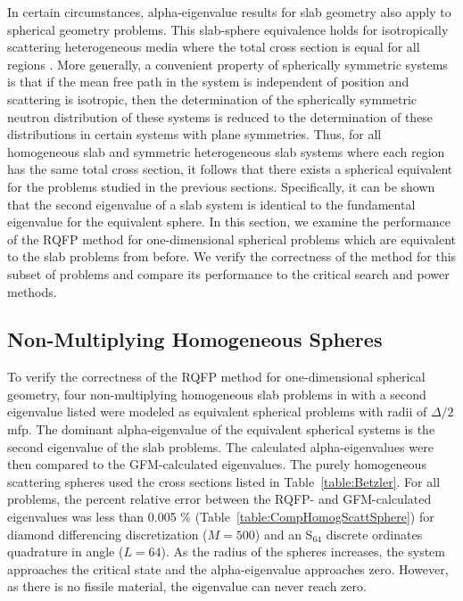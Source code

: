 In certain circumstances, alpha-eigenvalue results for slab geometry also apply to spherical geometry problems. This slab-sphere equivalence holds for isotropically scattering heterogeneous media where the total cross section is equal for all regions \cite{davison1957neutron}. More generally, a convenient property of spherically symmetric systems is that if the mean free path in the system is independent of position and scattering is isotropic, then the determination of the spherically symmetric neutron distribution of these systems is reduced to the determination of these distributions in certain systems with plane symmetries. Thus, for all homogeneous slab and symmetric heterogeneous slab systems where each region has the same total cross section, it follows that there exists a spherical equivalent for the problems studied in the previous sections. Specifically, it can be shown that the second eigenvalue of a slab system is identical to the fundamental eigenvalue for the equivalent sphere. In this section, we examine the performance of the RQFP method for one-dimensional spherical problems which are equivalent to the slab problems from before. We verify the correctness of the method for this subset of problems and compare its performance to the critical search and power methods.

\subsection{Non-Multiplying Homogeneous Spheres}

To verify the correctness of the RQFP method for one-dimensional spherical geometry, four non-multiplying homogeneous slab problems in \cite{kornreich_greens_1997} with a second eigenvalue listed were modeled as equivalent spherical problems with radii of $\Delta/2$ mfp. The dominant alpha-eigenvalue of the equivalent spherical systems is the second eigenvalue of the slab problems. The calculated alpha-eigenvalues were then compared to the GFM-calculated eigenvalues. The purely homogeneous scattering spheres used the cross sections listed in Table~\ref{table:Betzler}. For all problems, the percent relative error between the RQFP- and GFM-calculated eigenvalues was less than 0.005 \% (Table~\ref{table:CompHomogScattSphere}) for diamond differencing discretization ($M=500$) and an S$_{64}$ discrete ordinates quadrature in angle ($L=64$). As the radius of the spheres increases, the system approaches the critical state and the alpha-eigenvalue approaches zero. However, as there is no fissile material, the eigenvalue can never reach zero.

